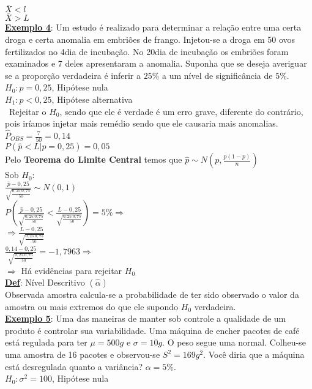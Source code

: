\documentclass[12pt, oneside]{article}
\begin{document}
$\bar{X}<l$\\
$\bar{X}>L$\\
\noindent\textbf{\underline{Exemplo 4}}: Um estudo é realizado para determinar a relação entre uma certa droga e certa anomalia em embriões de frango. Injetou-se a droga em 50 ovos fertilizados no 4\textordmasculine dia de incubação. No 20\textordmasculine dia de incubação os embriões foram examinados e 7 deles apresentaram a anomalia. Suponha que se deseja averiguar se a proporção verdadeira é inferir a $25\%$ a um nível de significância de $5\%$.\\
$H_0: p=0,25$, Hipótese nula\\
$H_1: p<0,25$, Hipótese alternativa\\\
Rejeitar o $H_0$, sendo que ele é verdade é um erro grave, diferente do contrário, pois iríamos injetar mais remédio sendo que ele causaria mais anomalias.\\
$\hat{P}_{OBS}=\frac{7}{50}=0,14$\\
$P(\hat{p}<L|p=0,25)=0,05$\\
Pelo \textbf{Teorema do Limite Central} temos que $\hat{p}\sim N(p,\frac{p(1-p)}{n})$\\
Sob $H_0$:\\
$\frac{\hat{p}-0,25}{\sqrt{\frac{0,25.0,75}{50}}}\sim N(0,1)$\\
$P(\frac{\hat{p}-0,25}{\sqrt{\frac{0,25.0,75}{50}}}<\frac{L-0,25}{\sqrt{\frac{0,25.0,75}{50}}})=5\%\Rightarrow$\\
$\Rightarrow\frac{L-0,25}{\sqrt{\frac{0,25.0,75}{50}}}$\\
$\frac{0,14-0,25}{\sqrt{\frac{0,25.0,75}{50}}}=-1,7963\Rightarrow$\\
$\Rightarrow$ Há evidências para rejeitar $H_0$\\
\noindent\textbf{\underline{Def}}: Nível Descritivo $(\hat{\alpha})$\\
Observada amostra calcula-se a probabilidade de ter sido observado o valor da amostra ou mais extremos do que ele supondo $H_0$ verdadeira.\\
\noindent\textbf{\underline{Exemplo 5}}: Uma das maneiras de manter sob controle a qualidade de um produto é controlar sua variabilidade. Uma máquina de encher pacotes de café está regulada para ter $\mu=500g$ e $\sigma=10g$. O  peso segue uma normal. Colheu-se uma amostra de 16 pacotes e observou-se $S^2=169g^2$. Você diria que a máquina está desregulada quanto a variância? $\alpha=5\%$.\\
$H_0: \sigma^2=100$, Hipótese nula\\
\end{document}
